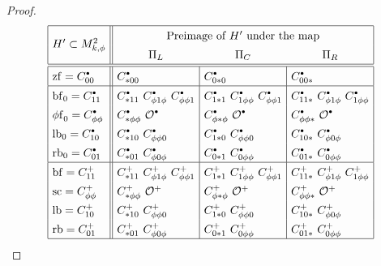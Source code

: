 \documentclass[11pt]{article}
\numberwithin{equation}{section}
\newcommand{\bbullet}{{\scriptscriptstyle\bullet}}
\newcommand{\sbullet}{{\raisebox{1pt}{$\bbullet$}}}
\theoremstyle{plain}
\theoremstyle{definition}
\newcommand\calO{{\mathcal O}}
\newcommand{\phif}{{\phi\mathrm{f}}}
\newcommand{\lf}{{\mathrm{lb}}}
\newcommand{\rf}{{\mathrm{rb}}}
\newcommand{\bbf}{{\mathrm{bf}}}
\newcommand{\ssc}{{\mathrm{sc}}}
\newcommand{\zf}{{\mathrm{zf}}}
\begin{document}
\begin{proof}
\begin{table}
\[
\arraycolsep4pt
\renewcommand{\arraystretch}{1.4}
\begin{array}[h]{|l || l | l | l|}
\hline
\multirow{2}{*}{$H'\subset M^2_{k,\phi}$} &
\multicolumn{3}{c|}{\text{Preimage of $H'$ under the map}} \\
& \multicolumn{1}{c}{\Pi_L} & \multicolumn{1}{c}{\Pi_C} & \multicolumn{1}{c|}{\Pi_R}
\\
\hline\hline
\zf = C_{00}^\sbullet
&
C_{*00}^\sbullet
& C_{0*0}^\sbullet
& C_{00*}^\sbullet
\\
\hline
\bbf_0=C_{11}^\sbullet
&
C_{*11}^\sbullet \ C_{\phi1\phi}^\sbullet \ C_{\phi\phi1}^\sbullet
&
C_{1*1}^\sbullet \ C_{1\phi\phi}^\sbullet \ C_{\phi\phi1}^\sbullet
&
C_{11*}^\sbullet \ C_{\phi1\phi}^\sbullet \ C_{1\phi\phi}^\sbullet
\\
\phif_0 = C_{\phi\phi}^\sbullet
&
C_{*\phi\phi}^\sbullet \ \calO^\sbullet
&
C_{\phi*\phi}^\sbullet \ \calO^\sbullet
&
C_{\phi\phi*}^\sbullet \ \calO^\sbullet
\\
\lf_0 = C_{10}^\sbullet
& C_{*10}^\sbullet \ C_{\phi\phi0}^\sbullet
& C_{1*0}^\sbullet \ C_{\phi\phi0}^\sbullet
& C_{10*}^\sbullet \ C_{\phi0\phi}^\sbullet
\\
\rf_0 = C_{01}^\sbullet
& C_{*01}^\sbullet \ C_{\phi0\phi}^\sbullet
& C_{0*1}^\sbullet \ C_{0\phi\phi}^\sbullet
& C_{01*}^\sbullet \ C_{0\phi\phi}^\sbullet
\\
\hline
\bbf = C_{11}^+
&
C_{*11}^+ \ C_{\phi1\phi}^+ \ C_{\phi\phi1}^+
&
C_{1*1}^+ \ C_{1\phi\phi}^+ \ C_{\phi\phi1}^+
&
C_{11*}^+ \ C_{\phi1\phi}^+ \ C_{1\phi\phi}^+
\\
\ssc = C_{\phi\phi}^+
&
C_{*\phi\phi}^+ \ \calO^+
&
C_{\phi*\phi}^+ \ \calO^+
&
C_{\phi\phi*}^+ \ \calO^+
\\
\lf = C_{10}^+
& C_{*10}^+ \ C_{\phi\phi0}^+
& C_{1*0}^+ \ C_{\phi\phi0}^+
& C_{10*}^+ \ C_{\phi0\phi}^+
\\
\rf = C_{01}^+
& C_{*01}^+ \ C_{\phi0\phi}^+
& C_{0*1}^+ \ C_{0\phi\phi}^+
& C_{01*}^+ \ C_{0\phi\phi}^+
\\
\hline
\end{array}
\]
\caption{\label{table:exp matrix}Relations of boundary hypersurfaces of $M^3_{k,\phi}$ and $M^2_{k,\phi}$ under the maps $\Pi_L$, $\Pi_C$ and $\Pi_R$; a $*$ means that both faces with $*=0$ and $*=1$ occur. The bottom four lines are a copy of the middle four lines, with $\sbullet$ replaced by $+$.}
\vspace*{-\baselineskip}
\end{table}


\end{proof}
\end{document}
